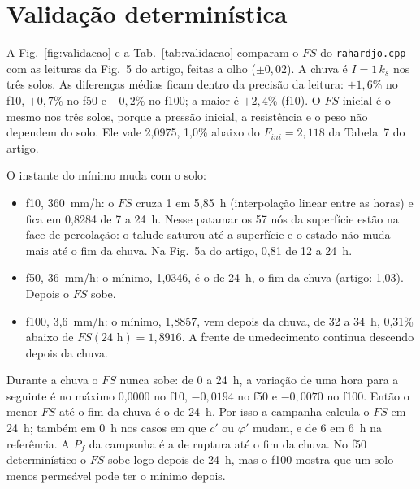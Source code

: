 \documentclass[11pt,a4paper]{article}
\begin{document}
\section{Validação determinística}\label{sec:validacao}
A Fig.~\ref{fig:validacao} e a Tab.~\ref{tab:validacao} comparam o $FS$ do \texttt{rahardjo.cpp} com as leituras da
Fig.~5 do artigo, feitas a olho ($\pm 0{,}02$). A chuva é $I = 1\,k_s$ nos três solos. As diferenças médias ficam dentro
da precisão da leitura: $+1{,}6\%$ no f10, $+0{,}7\%$ no f50 e $-0{,}2\%$ no f100; a maior é $+2{,}4\%$ (f10). O $FS$ inicial
é o mesmo nos três solos, porque a pressão inicial, a resistência e o peso não dependem do solo. Ele vale 2,0975, 1,0\%
abaixo do $F_{ini} = 2{,}118$ da Tabela~7 do artigo.


O instante do mínimo muda com o solo:
\begin{itemize}
\item f10, 360~mm/h: o $FS$ cruza 1 em 5,85~h (interpolação linear entre as horas) e fica em 0,8284 de 7 a 24~h. Nesse
patamar os 57 nós da superfície estão na face de percolação: o talude saturou até a superfície e o estado não muda mais
até o fim da chuva. Na Fig.~5a do artigo, 0,81 de 12 a 24~h.
\item f50, 36~mm/h: o mínimo, 1,0346, é o de 24~h, o fim da chuva (artigo: 1,03). Depois o $FS$ sobe.
\item f100, 3,6~mm/h: o mínimo, 1,8857, vem depois da chuva, de 32 a 34~h, 0,31\% abaixo de $FS(24\text{ h}) = 1{,}8916$.
A frente de umedecimento continua descendo depois da chuva.
\end{itemize}
Durante a chuva o $FS$ nunca sobe: de 0 a 24~h, a variação de uma hora para a seguinte é no máximo 0,0000 no f10,
$-0{,}0194$ no f50 e $-0{,}0070$ no f100. Então o menor $FS$ até o fim da chuva é o de 24~h. Por isso a campanha calcula
o $FS$ em 24~h; também em 0~h nos casos em que $c'$ ou $\varphi'$ mudam, e de 6 em 6~h na referência. A $P_f$ da campanha
é a de ruptura até o fim da chuva. No f50 determinístico o $FS$ sobe logo depois de 24~h, mas o f100 mostra que um solo
menos permeável pode ter o mínimo depois.
\end{document}
